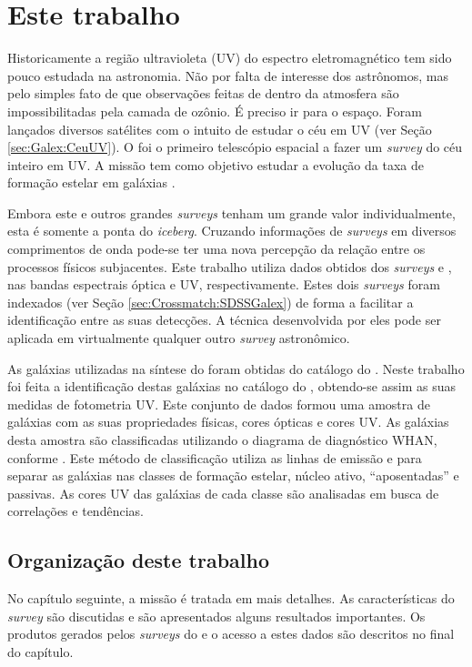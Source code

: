 \section{Este trabalho}
\label{sec:Intro:EsteTrab}

Historicamente a região ultravioleta (UV) do espectro eletromagnético tem sido
pouco estudada na astronomia. Não por falta de interesse dos astrônomos, mas
pelo simples fato de que observações feitas de dentro da atmosfera são
impossibilitadas pela camada de ozônio. É preciso ir para o espaço. Foram
lançados diversos satélites com o intuito de estudar o céu em UV (ver Seção
\ref{sec:Galex:CeuUV}). O \galex foi o primeiro telescópio espacial a fazer um
{\em survey} do céu inteiro em UV. A missão tem como objetivo estudar a evolução
da taxa de formação estelar em galáxias \citep{Martin2005}.

Embora este e outros grandes {\em surveys} tenham um grande valor
individualmente, esta é somente a ponta do {\em iceberg}. Cruzando informações
de {\em surveys} em diversos comprimentos de onda pode-se ter uma nova percepção
da relação entre os processos físicos subjacentes. Este trabalho utiliza dados
obtidos dos {\em surveys} \SDSS e \galex, nas bandas espectrais óptica e UV,
respectivamente. Estes dois {\em surveys} foram indexados (ver Seção
\ref{sec:Crossmatch:SDSSGalex}) de forma a facilitar a identificação entre as
suas detecções. A técnica desenvolvida por eles pode ser aplicada em
virtualmente qualquer outro {\em survey} astronômico.

As galáxias utilizadas na síntese do \starlight foram obtidas do catálogo do
\SDSS. Neste trabalho foi feita a identificação destas galáxias no catálogo do
\galex, obtendo-se assim as suas medidas de fotometria UV. Este conjunto de
dados formou uma amostra de galáxias com as suas propriedades físicas, cores
ópticas e cores UV. As galáxias desta amostra são classificadas utilizando o
diagrama de diagnóstico WHAN, conforme \citet{CidFernandes2011}. Este método de
classificação utiliza as linhas de emissão \Halpha e \NII para separar as
galáxias nas classes de formação estelar, núcleo ativo, ``aposentadas'' e
passivas. As cores UV das galáxias de cada classe são analisadas em busca de
correlações e tendências.

\subsection{Organização deste trabalho}

No capítulo seguinte, a missão \galex é tratada em mais detalhes. As
características do {\em survey} são discutidas e são apresentados alguns
resultados importantes. Os produtos gerados pelos {\em surveys} do \galex e o
acesso a estes dados são descritos no final do capítulo.

